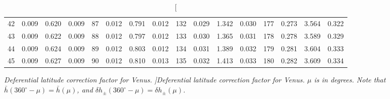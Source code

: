 \begin{table}
{\begin{tabular}{rrrr|rrrr|rrrr|crrr}
 42 & \tiny{  0.009} &   0.620 & \tiny{  0.009} &  87 & \tiny{  0.012} &   0.791 & \tiny{  0.012} & 132 & \tiny{  0.029} &   1.342 & \tiny{  0.030} & 177 & \tiny{  0.273} &   3.564 & \tiny{  0.322}\\
 43 & \tiny{  0.009} &   0.622 & \tiny{  0.009} &  88 & \tiny{  0.012} &   0.797 & \tiny{  0.012} & 133 & \tiny{  0.030} &   1.365 & \tiny{  0.031} & 178 & \tiny{  0.278} &   3.589 & \tiny{  0.329}\\
 44 & \tiny{  0.009} &   0.624 & \tiny{  0.009} &  89 & \tiny{  0.012} &   0.803 & \tiny{  0.012} & 134 & \tiny{  0.031} &   1.389 & \tiny{  0.032} & 179 & \tiny{  0.281} &   3.604 & \tiny{  0.333}\\
 45 & \tiny{  0.009} &   0.627 & \tiny{  0.009} &  90 & \tiny{  0.012} &   0.810 & \tiny{  0.013} & 135 & \tiny{  0.032} &   1.413 & \tiny{  0.033} & 180 & \tiny{  0.282} &   3.609 & \tiny{  0.334}\\
\end{tabular}}
\caption[\em  Deferential latitude correction factor for Venus. ]{\em Deferential latitude correction factor for Venus. $\mu$ is in degrees. Note that $\bar{h}(360^\circ-\mu) = \bar{h}(\mu)$, and $\delta h_{\pm}(360^\circ-\mu) = \delta h_{\pm}(\mu)$. }\label{tlat2v}
\end{table}

